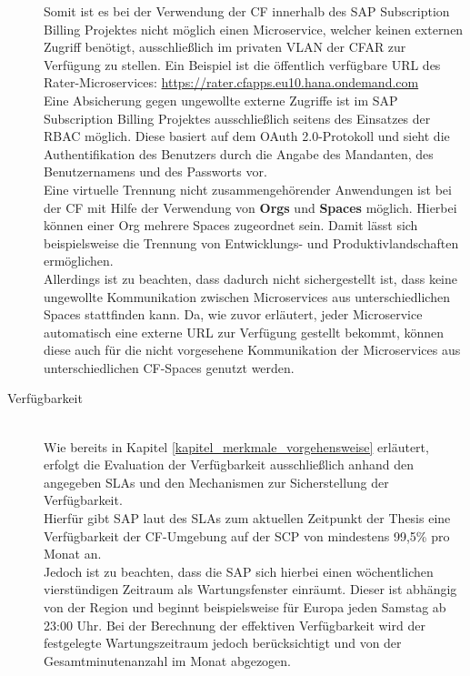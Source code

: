 \begin{description}
	\newpage
	Somit ist es bei der Verwendung der \ac{CF} innerhalb des SAP Subscription Billing Projektes nicht möglich einen Microservice, welcher keinen externen Zugriff benötigt, ausschließlich im privaten \ac{VLAN} der \ac{CFAR} zur Verfügung zu stellen. 
	Ein Beispiel ist die öffentlich verfügbare \ac{URL} des Rater-Microservices: \url{https://rater.cfapps.eu10.hana.ondemand.com}
	\\
	Eine Absicherung gegen ungewollte externe Zugriffe ist im SAP Subscription Billing Projektes ausschließlich seitens des Einsatzes der \ac{RBAC} möglich. 
	Diese basiert auf dem OAuth 2.0-Protokoll und sieht die Authentifikation des Benutzers durch die Angabe des Mandanten, des Benutzernamens und des Passworts vor. 
	\\
	Eine virtuelle Trennung nicht zusammengehörender Anwendungen ist bei der \ac{CF} mit Hilfe der Verwendung von \textbf{Orgs} und \textbf{Spaces} möglich. Hierbei können einer Org mehrere Spaces zugeordnet sein. Damit lässt sich beispielsweise die Trennung von Entwicklungs- und Produktivlandschaften ermöglichen.\\ 
	Allerdings ist zu beachten, dass dadurch nicht sichergestellt ist, dass keine ungewollte Kommunikation zwischen Microservices aus unterschiedlichen Spaces stattfinden kann. Da, wie zuvor erläutert, jeder Microservice automatisch eine externe \ac{URL} zur Verfügung gestellt bekommt, können diese auch für die nicht vorgesehene Kommunikation der Microservices aus unterschiedlichen \ac{CF}-Spaces genutzt werden.\autocite[Vgl.][Isolation Segments]{CloudFoundryFoundation.20191217}
	\item[Verfügbarkeit] \hfill \\
	Wie bereits in Kapitel \ref{kapitel_merkmale_vorgehensweise} erläutert, erfolgt die Evaluation der Verfügbarkeit ausschließlich anhand den angegeben \acsp{SLA} und den Mechanismen zur Sicherstellung der Verfügbarkeit.\\
	Hierfür gibt SAP laut des \acsp{SLA} zum aktuellen Zeitpunkt der Thesis eine Verfügbarkeit der \ac{CF}-Umgebung auf der \ac{SCP} von mindestens 99,5\% pro Monat an.\\
	Jedoch ist zu beachten, dass die SAP sich hierbei einen wöchentlichen vierstündigen Zeitraum als Wartungsfenster einräumt. Dieser ist abhängig von der Region und beginnt beispielsweise für Europa jeden Samstag ab 23:00 Uhr. Bei der Berechnung der effektiven Verfügbarkeit wird der festgelegte Wartungszeitraum jedoch berücksichtigt und von der Gesamtminutenanzahl im Monat abgezogen.\autocite[Vgl.][Systemverfügbarkeit]{SAPSEodereinSAPKonzernunternehmen.2019}\\

\end{description}
